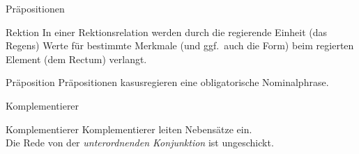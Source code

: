 \begin{frame}
  {Präpositionen}
  \pause
  \begin{exe}
    \ex
    \begin{xlist}
      \pause
      \pause
      \pause
    \end{xlist}
  \end{exe}
  \pause
  \pause
  \pause
  \Zeile
  \begin{block}{Rektion}
    In einer Rektionsrelation werden durch die regierende Einheit (das \alert{Regens}) Werte für bestimmte Merkmale (und ggf.\ auch die Form) beim regierten Element (dem \alert{Rectum}) verlangt.\\
  \end{block}
  \Zeile
  \pause
  \begin{block}{Präposition}
    Präpositionen kasusregieren eine obligatorische Nominalphrase.
  \end{block}
\end{frame}

\begin{frame}
  {Komplementierer}
  \pause
  \begin{exe}
    \ex
    \begin{xlist}
    \end{xlist}
  \end{exe}
  \Zeile
  \pause
  \pause
  \pause
  \pause
  \pause
  \pause
  \pause
  \pause
  \pause
  \pause
  \begin{block}{Komplementierer}
    Komplementierer leiten Nebensätze ein.\\
    Die Rede von der \textit{unterordnenden Konjunktion} ist ungeschickt.
  \end{block}
\end{frame}

